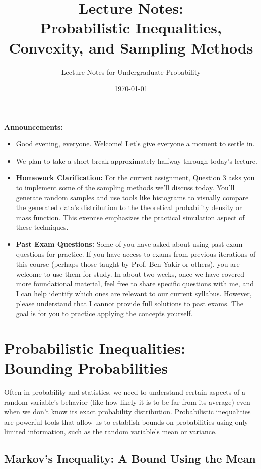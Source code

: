 \documentclass[11pt, letterpaper]{article}
\title{Lecture Notes: \\ Probabilistic Inequalities, Convexity, and Sampling Methods}
\author{Lecture Notes for Undergraduate Probability} %
\date{\today} %
\theoremstyle{plain} %
\theoremstyle{definition} %
\theoremstyle{remark} %
\newenvironment{announcement}
  {\begin{center}\begin{framed}\noindent\textbf{Announcements:}\begin{itemize}}
  {\end{itemize}\end{framed}\end{center}}
\begin{document}
\maketitle

\begin{announcement}
    \item Good evening, everyone. Welcome! Let's give everyone a moment to settle in.
    \item We plan to take a short break approximately halfway through today's lecture.
    \item \textbf{Homework Clarification:} For the current assignment, Question 3 asks you to implement some of the sampling methods we'll discuss today. You'll generate random samples and use tools like histograms to visually compare the generated data's distribution to the theoretical probability density or mass function. This exercise emphasizes the practical simulation aspect of these techniques.
    \item \textbf{Past Exam Questions:} Some of you have asked about using past exam questions for practice. If you have access to exams from previous iterations of this course (perhaps those taught by Prof. Ben Yakir or others), you are welcome to use them for study. In about two weeks, once we have covered more foundational material, feel free to share specific questions with me, and I can help identify which ones are relevant to our current syllabus. However, please understand that I cannot provide full solutions to past exams. The goal is for you to practice applying the concepts yourself.
\end{announcement}

\section{Probabilistic Inequalities: Bounding Probabilities}

Often in probability and statistics, we need to understand certain aspects of a random variable's behavior (like how likely it is to be far from its average) even when we don't know its exact probability distribution. Probabilistic inequalities are powerful tools that allow us to establish bounds on probabilities using only limited information, such as the random variable's mean or variance.

\subsection{Markov's Inequality: A Bound Using the Mean}
\end{document}
